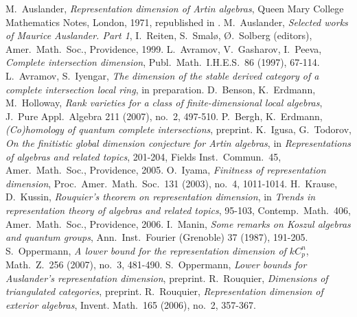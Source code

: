 \documentclass[a4paper]{amsart}
\theoremstyle{definition}
\theoremstyle{definition}
\theoremstyle{definition}
\theoremstyle{definition}
\theoremstyle{definition}
\theoremstyle{definition}
\theoremstyle{remark}
\theoremstyle{remark}
\theoremstyle{definition}
\theoremstyle{definition}
\begin{document}
\begin{thebibliography}{AGP}
M.\ Auslander, \emph{Representation
dimension of Artin algebras}, Queen Mary College Mathematics Notes,
London, 1971, republished in \cite{Auslander2}.
M.\ Auslander, \emph{Selected works of
Maurice Auslander. Part 1}, I.\ Reiten, S.\ Smal{\o}, {\O}.\ Solberg
(editors), Amer.\ Math.\ Soc., Providence, 1999.
L.\ Avramov, V.\ Gasharov, I.\ Peeva,
  \emph{Complete intersection dimension}, Publ.\ Math.\ I.H.E.S.\ 86
  (1997), 67-114.
L.\ Avramov, S.\ Iyengar, \emph{The dimension
of the stable derived category of a complete intersection local
ring}, in preparation.
D.\ Benson, K.\ Erdmann, M.\ Holloway, \emph{Rank
    varieties for a class of finite-dimensional local algebras}, J.\
  Pure Appl.\ Algebra 211 (2007), no.\ 2, 497-510.
P.\ Bergh, K.\ Erdmann, \emph{(Co)homology of
quantum complete intersections}, preprint.
K.\ Igusa, G.\ Todorov, \emph{On the finitistic
global dimension conjecture for Artin algebras}, in
\emph{Representations of algebras and related topics}, 201-204,
Fields Inst.\ Commun.\ 45, Amer.\ Math.\ Soc., Providence, 2005.
\bibitem[Iya]{Iyama}O.\ Iyama, \emph{Finitness of representation
dimension}, Proc.\ Amer.\ Math.\ Soc.\ 131 (2003), no.\ 4,
1011-1014.
H.\ Krause, D.\ Kussin, \emph{Rouquier's
theorem on representation dimension}, in \emph{Trends in
representation theory of algebras and related topics}, 95-103,
Contemp.\ Math.\ 406, Amer.\ Math.\ Soc., Providence, 2006.
I.\ Manin, \emph{Some remarks on Koszul algebras
    and quantum groups}, Ann.\ Inst.\ Fourier (Grenoble) 37 (1987),
  191-205.
S.\ Oppermann, \emph{A lower bound for the
representation dimension of $kC_p^n$}, Math.\ Z.\ 256 (2007), no.\
3, 481-490.
\bibitem[Op2]{Oppermann2}S.\ Oppermann, \emph{Lower bounds for
Auslander's representation dimension}, preprint.
\bibitem[Ro1]{Rouquier1}R.\ Rouquier, \emph{Dimensions of
triangulated categories}, preprint.
\bibitem[Ro2]{Rouquier2}R.\ Rouquier, \emph{Representation dimension
of exterior algebras}, Invent. Math.\ 165 (2006), no.\ 2, 357-367.
\end{thebibliography}
\end{document}
